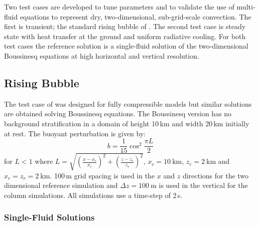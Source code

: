 \documentclass[draft]{agujournal2019}
\begin{document}
Two test cases are developed to tune parameters and to validate the
use of multi-fluid equations to represent dry, two-dimensional, sub-grid-scale
convection. The first is transient; the standard rising bubble of
.  The second test case is steady state with heat transfer at
the ground and uniform radiative cooling. For both test cases the
reference solution is a single-fluid solution of the two-dimensional
Boussinesq equations at high horizontal and vertical resolution. 

\subsection{Rising Bubble}

The  test case of  was designed for fully compressible
models but similar solutions are obtained solving Boussinesq equations.
The Boussinesq version has no background stratification in a domain
of height 10\,km and width 20\,km initially at rest. The buoyant
perturbation is given by:
\begin{equation}
b=\frac{1}{15}\cos^{2}\frac{\pi L}{2}\label{eq:thetaPerturb}
\end{equation}
for $L<1$ where $L=\sqrt{\left(\frac{x-x_{c}}{x_{r}}\right)^{2}+\left(\frac{z-z_{c}}{z_{r}}\right)^{2}}$,
$x_{c}=10\ \text{km}$, $z_{c}=2\ \text{km}$ and $x_{r}=z_{r}=2\ \text{km}$.
100\,m grid spacing is used in the $x$ and $z$ directions for the
two dimensional reference simulation and $\Delta z=100\ \text{m}$
is used in the vertical for the  column simulations. All simulations
use a time-step of 2\,s.

\subsubsection{Single-Fluid Solutions}
\end{document}

